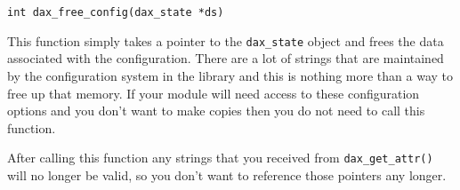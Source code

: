\begin{verbatim}
int dax_free_config(dax_state *ds)
\end{verbatim}

This function simply takes a pointer to the \verb|dax_state| object and frees the data associated with the configuration.  There are a lot of strings that are maintained by the configuration system in the library and this is nothing more than a way to free up that memory.  If your module will need access to these configuration options and you don't want to make copies then you do not need to call this function.

After calling this function any strings that you received from \verb|dax_get_attr()| will no longer be valid, so you don't want to reference those pointers any longer.